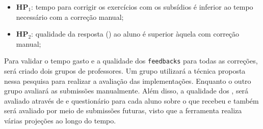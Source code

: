 \begin{itemize}
	\item \textbf{HP$_1$}: tempo para corrigir os exercícios com os subsídios é inferior
	ao tempo necessário com a correção manual;
	\item \textbf{HP$_2$}: qualidade da resposta () ao aluno é superior
	àquela com correção manual;
\end{itemize}

Para validar o tempo gasto e a qualidade dos \texttt{feedbacks} para todas as correções,
será criado dois grupos de professores. Um grupo utilizará a técnica proposta nessa pesquisa para
realizar a avaliação das implementações. Enquanto o outro grupo avaliará as submissões
manualmente. Além disso, a qualidade dos , será avaliado através de 
e questionário para cada aluno sobre o  que recebeu e também será avaliado
por meio de submissões futuras, visto que a ferramenta realiza várias projeções ao longo do tempo.
